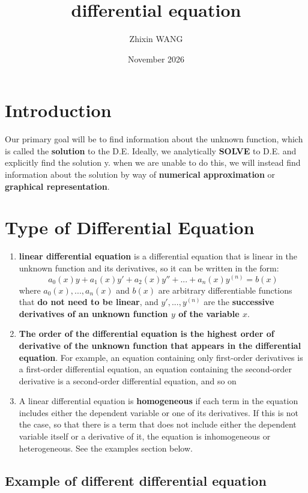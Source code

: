 \documentclass{article}
\title{differential equation}
\author{Zhixin WANG}
\date{November 2026}
\begin{document}
\maketitle

\section{Introduction}
Our primary goal will be to find information about the unknown function, which is called the \textbf{solution} to the D.E. Ideally, we analytically \textbf{SOLVE} to D.E. and explicitly find the solution y. when we are unable to do this, we will instead find information about the solution by way of \textbf{numerical approximation} or \textbf{graphical representation}.

\section{Type of Differential Equation}
\begin{enumerate}
    \item \textbf{linear differential equation} is a differential equation that is linear in the unknown function and its derivatives, so it can be written in the form:
    $$a_0(x)y + a_1(x)y' + a_2(x)y'' + ... + a_n(x)y^{(n)} = b(x)$$
    where $a_0(x), ..., a_n(x)$ and $b(x)$ are arbitrary differentiable functions that \textbf{do not need to be linear}, and $y', ..., y^{(n)}$ are the \textbf{successive derivatives of an unknown function $y$ of the variable $x$}.
    \item \textbf{The order of the differential equation is the highest order of derivative of the unknown function that appears in the differential equation}. For example, an equation containing only first-order derivatives is a first-order differential equation, an equation containing the second-order derivative is a second-order differential equation, and so on
    \item A linear differential equation is \textbf{homogeneous} if each term in the equation includes either the dependent variable or one of its derivatives. If this is not the case, so that there is a term that does not include either the dependent variable itself or a derivative of it, the equation is inhomogeneous or heterogeneous. See the examples section below.
\end{enumerate}

\subsection{Example of different differential equation}
\end{document}
